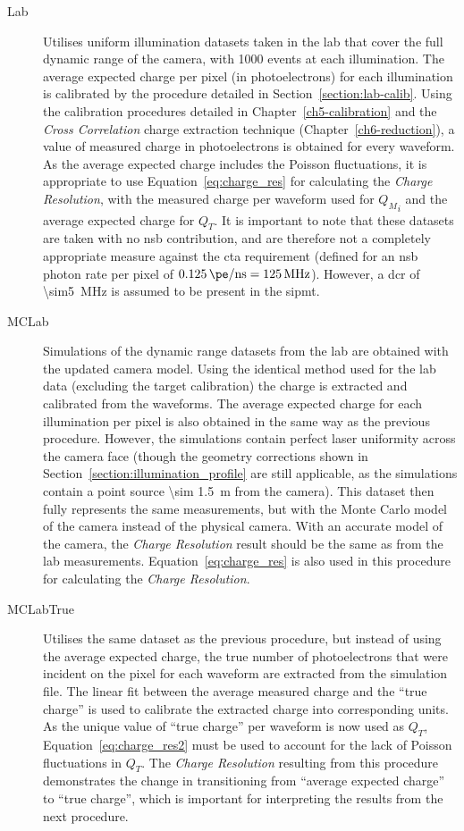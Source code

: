 \begin{description}
\item [Lab] Utilises uniform illumination datasets taken in the lab that cover the full dynamic range of the camera, with 1000 events at each illumination. The average expected charge per pixel (in photoelectrons) for each illumination is calibrated by the procedure detailed in Section~\ref{section:lab-calib}. Using the calibration procedures detailed in Chapter~\ref{ch5-calibration} and the \textit{Cross Correlation} charge extraction technique (Chapter~\ref{ch6-reduction}), a value of measured charge in photoelectrons is obtained for every waveform. As the average expected charge includes the Poisson fluctuations, it is appropriate to use Equation~\ref{eq:charge_res} for calculating the \textit{Charge Resolution}, with the measured charge per waveform used for ${Q_M}_i$ and the average expected charge for $Q_T$. It is important to note that these datasets are taken with no \gls{nsb} contribution, and are therefore not a completely appropriate measure against the \gls{cta} requirement (defined for an \gls{nsb} photon rate per pixel of $\SI{0.125}{\pe/ns} = \SI{125}{MHz}$). However, a \gls{dcr} of \SI{\sim5}{MHz} is assumed to be present in the \gls{sipmt}.
\item [MCLab] Simulations of the dynamic range datasets from the lab are obtained with the updated  camera model. Using the identical method used for the lab data (excluding the \gls{target} calibration) the charge is extracted and calibrated from the waveforms. The average expected charge for each illumination per pixel is also obtained in the same way as the previous procedure. However, the simulations contain perfect laser uniformity across the camera face (though the geometry corrections shown in Section~\ref{section:illumination_profile} are still applicable, as the simulations contain a point source \SI{\sim 1.5}{m} from the camera). This dataset then fully represents the same measurements, but with the Monte Carlo model of the camera instead of the physical camera. With an accurate model of the camera, the \textit{Charge Resolution} result should be the same as from the lab measurements. Equation~\ref{eq:charge_res} is also used in this procedure for calculating the \textit{Charge Resolution}.
\item [MCLabTrue] Utilises the same dataset as the previous procedure, but instead of using the average expected charge, the true number of photoelectrons that were incident on the pixel for each waveform are extracted from the simulation file. The linear fit between the average measured charge and the ``true charge'' is used to calibrate the extracted charge into corresponding units. As the unique value of ``true charge'' per waveform is now used as $Q_T$, Equation~\ref{eq:charge_res2} must be used to account for the lack of Poisson fluctuations in $Q_T$. The \textit{Charge Resolution} resulting from this procedure demonstrates the change in transitioning from ``average expected charge'' to ``true charge'', which is important for interpreting the results from the next procedure.

\end{description}
